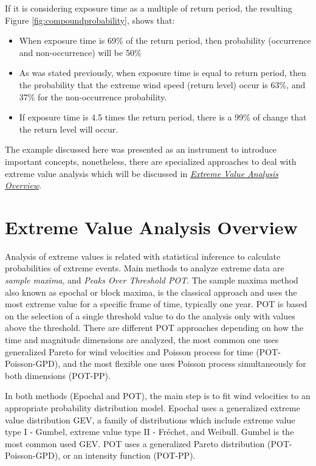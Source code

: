 \documentclass[12pt,oneside]{reedthesis}
\providecommand{\tightlist}{%
  \setlength{\itemsep}{0pt}\setlength{\parskip}{0pt}}
\begin{document}
If it is considering exposure time as a multiple of return period, the resulting Figure \ref{fig:compoundprobability}, shows that:
\begin{itemize}
\tightlist
\item
  When exposure time is 69\% of the return period, then probability (occurrence and non-occurrence) will be 50\%
\item
  As was stated previously, when exposure time is equal to return period, then the probability that the extreme wind speed (return level) occur is 63\%, and 37\% for the non-occurrence probability.
\item
  If exposure time is 4.5 times the return period, there is a 99\% of change that the return level will occur.
\end{itemize}
The example discussed here was presented as an instrument to introduce important concepts, nonetheless, there are specialized approaches to deal with extreme value analysis which will be discussed in \emph{\protect\hyperlink{extremeoverview}{Extreme Value Analysis Overview}}.

\hypertarget{extremeoverview}{%
\section{Extreme Value Analysis Overview}\label{extremeoverview}}

Analysis of extreme values is related with statistical inference to calculate probabilities of extreme events. Main methods to analyze extreme data are \emph{sample maxima}, and \emph{Peaks Over Threshold POT}. The sample maxima method also known as epochal or block maxima, is the classical approach and uses the most extreme value for a specific frame of time, typically one year. POT is based on the selection of a single threshold value to do the analysis only with values above the threshold. There are different POT approaches depending on how the time and magnitude dimensions are analyzed, the most common one uses generalized Pareto for wind velocities and Poisson process for time (POT-Poisson-GPD), and the most flexible one uses Poisson process simultaneously for both dimensions (POT-PP).

In both methods (Epochal and POT), the main step is to fit wind velocities to an appropriate probability distribution model. Epochal uses a generalized extreme value distribution GEV, a family of distributions which include extreme value type I - Gumbel, extreme value type II - Fréchet, and Weibull. Gumbel is the most common used GEV. POT uses a generalized Pareto distribution (POT-Poisson-GPD), or an intensity function (POT-PP).
\end{document}
